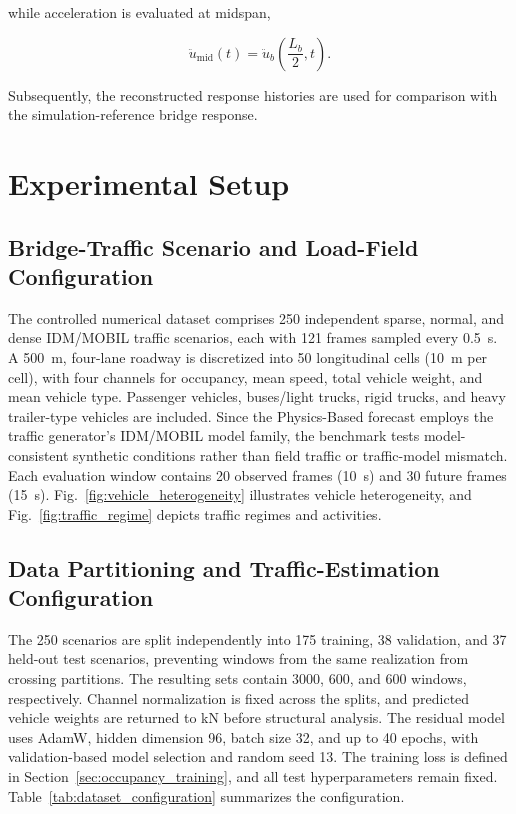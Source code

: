 \documentclass[journal]{IEEEtran}
\begin{document}
while acceleration is evaluated at midspan,

\begin{equation}
\ddot{u}_{\mathrm{mid}}(t)
=
\ddot{u}_b
\left(
\frac{L_b}{2},t
\right).
\end{equation}

Subsequently, the reconstructed response histories are used for comparison with the simulation-reference bridge response.




\section{Experimental Setup}

\subsection{Bridge-Traffic Scenario and Load-Field Configuration}

The controlled numerical dataset comprises 250 independent sparse, normal, and dense IDM/MOBIL traffic scenarios, each with 121 frames sampled every 0.5~s. A 500~m, four-lane roadway is discretized into 50 longitudinal cells (10~m per cell), with four channels for occupancy, mean speed, total vehicle weight, and mean vehicle type. Passenger vehicles, buses/light trucks, rigid trucks, and heavy trailer-type vehicles are included. Since the Physics-Based forecast employs the traffic generator's IDM/MOBIL model family, the benchmark tests model-consistent synthetic conditions rather than field traffic or traffic-model mismatch. Each evaluation window contains 20 observed frames (10~s) and 30 future frames (15~s). Fig.~\ref{fig:vehicle_heterogeneity} illustrates vehicle heterogeneity, and Fig.~\ref{fig:traffic_regime} depicts traffic regimes and activities.

\subsection{Data Partitioning and Traffic-Estimation Configuration}

The 250 scenarios are split independently into 175 training, 38 validation, and 37 held-out test scenarios, preventing windows from the same realization from crossing partitions. The resulting sets contain 3000, 600, and 600 windows, respectively. Channel normalization is fixed across the splits, and predicted vehicle weights are returned to kN before structural analysis. The residual model uses AdamW, hidden dimension 96, batch size 32, and up to 40 epochs, with validation-based model selection and random seed 13. The training loss is defined in Section~\ref{sec:occupancy_training}, and all test hyperparameters remain fixed. Table~\ref{tab:dataset_configuration} summarizes the configuration.
\end{document}
